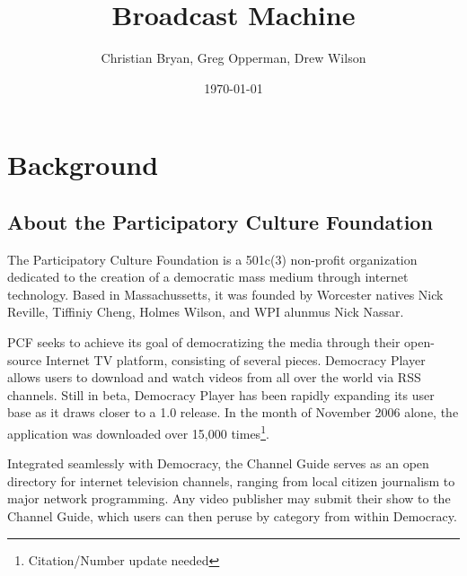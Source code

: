 \documentclass[a4paper,12pt]{report}
\author{Christian Bryan, Greg Opperman, Drew Wilson}
\date{\today}
\title{Broadcast Machine}
\begin{document}
\maketitle

\tableofcontents

\chapter{Background}

\section{About the Participatory Culture Foundation}
    The Participatory Culture Foundation is a 501c(3) non-profit organization dedicated to the creation of a democratic mass medium through internet technology.
Based in Massachussetts, it was founded by Worcester natives Nick Reville, Tiffiniy Cheng, Holmes Wilson, and WPI alunmus Nick Nassar.

    PCF seeks to achieve its goal of democratizing the media through their open-source Internet TV platform, consisting of several pieces.
Democracy Player allows users to download and watch videos from all over the world via RSS channels.
Still in beta, Democracy Player has been rapidly expanding its user base as it draws closer to a 1.0 release.
In the month of November 2006 alone, the application was downloaded over 15,000 times\footnote{Citation/Number update needed}.

Integrated seamlessly with Democracy, the Channel Guide serves as an open directory for internet television channels, ranging from local citizen journalism to major network programming.
Any video publisher may submit their show to the Channel Guide, which users can then peruse by category from within Democracy.
\end{document}
